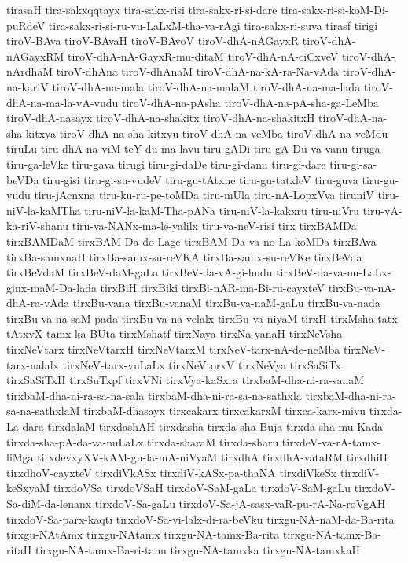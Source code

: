 {tirasaH
tira-sakxqqtayx
tira-sakx-risi
tira-sakx-ri-si-dare
tira-sakx-ri-si-koM-Di-puRdeV
tira-sakx-ri-si-ru-vu-LaLxM-tha-va-rAgi
tira-sakx-ri-suva
tirasf
tirigi
tiroV-BAva
tiroV-BAvaH
tiroV-BAvoV
tiroV-dhA-nAGayxR
tiroV-dhA-nAGayxRM
tiroV-dhA-nA-GayxR-mu-ditaM
tiroV-dhA-nA-ciCxveV
tiroV-dhA-nArdhaM
tiroV-dhAna
tiroV-dhAnaM
tiroV-dhA-na-kA-ra-Na-vAda
tiroV-dhA-na-kariV
tiroV-dhA-na-mala
tiroV-dhA-na-malaM
tiroV-dhA-na-ma-lada
tiroV-dhA-na-ma-la-vA-vudu
tiroV-dhA-na-pAsha
tiroV-dhA-na-pA-sha-ga-LeMba
tiroV-dhA-nasayx
tiroV-dhA-na-shakitx
tiroV-dhA-na-shakitxH
tiroV-dhA-na-sha-kitxya
tiroV-dhA-na-sha-kitxyu
tiroV-dhA-na-veMba
tiroV-dhA-na-veMdu
tiruLu
tiru-dhA-na-viM-teY-du-ma-lavu
tiru-gADi
tiru-gA-Du-va-vanu
tiruga
tiru-ga-leVke
tiru-gava
tirugi
tiru-gi-daDe
tiru-gi-danu
tiru-gi-dare
tiru-gi-sa-beVDa
tiru-gisi
tiru-gi-su-vudeV
tiru-gu-tAtxne
tiru-gu-tatxleV
tiru-guva
tiru-gu-vudu
tiru-jAcnxna
tiru-ku-ru-pe-toMDa
tiru-mUla
tiru-nA-LopxVva
tiruniV
tiru-niV-la-kaMTha
tiru-niV-la-kaM-Tha-pANa
tiru-niV-la-kakxru
tiru-niVru
tiru-vA-ka-riV-shanu
tiru-va-NANx-ma-le-yalilx
tiru-va-neV-risi
tirx
tirxBAMDa
tirxBAMDaM
tirxBAM-Da-do-Lage
tirxBAM-Da-va-no-La-koMDa
tirxBAva
tirxBa-samxnaH
tirxBa-samx-su-reVKA
tirxBa-samx-su-reVKe
tirxBeVda
tirxBeVdaM
tirxBeV-daM-gaLa
tirxBeV-da-vA-gi-hudu
tirxBeV-da-va-nu-LaLx-ginx-maM-Da-lada
tirxBiH
tirxBiki
tirxBi-nAR-ma-Bi-ru-cayxteV
tirxBu-va-nA-dhA-ra-vAda
tirxBu-vana
tirxBu-vanaM
tirxBu-va-naM-gaLu
tirxBu-va-nada
tirxBu-va-na-saM-pada
tirxBu-va-na-velalx
tirxBu-va-niyaM
tirxH
tirxMsha-tatx-tAtxvX-tamx-ka-BUta
tirxMshatf
tirxNaya
tirxNa-yanaH
tirxNeVsha
tirxNeVtarx
tirxNeVtarxH
tirxNeVtarxM
tirxNeV-tarx-nA-de-neMba
tirxNeV-tarx-nalalx
tirxNeV-tarx-vuLaLx
tirxNeVtorxV
tirxNeVya
tirxSaSiTx
tirxSaSiTxH
tirxSuTxpf
tirxVNi
tirxVya-kaSxra
tirxbaM-dha-ni-ra-sanaM
tirxbaM-dha-ni-ra-sa-na-sala
tirxbaM-dha-ni-ra-sa-na-sathxla
tirxbaM-dha-ni-ra-sa-na-sathxlaM
tirxbaM-dhasayx
tirxcakarx
tirxcakarxM
tirxca-karx-mivu
tirxda-La-dara
tirxdalaM
tirxdashAH
tirxdasha
tirxda-sha-Buja
tirxda-sha-mu-Kada
tirxda-sha-pA-da-va-nuLaLx
tirxda-sharaM
tirxda-sharu
tirxdeV-va-rA-tamx-liMga
tirxdevxyXV-kAM-gu-la-mA-niVyaM
tirxdhA
tirxdhA-vataRM
tirxdhiH
tirxdhoV-cayxteV
tirxdiVkASx
tirxdiV-kASx-pa-thaNA
tirxdiVkeSx
tirxdiV-keSxyaM
tirxdoVSa
tirxdoVSaH
tirxdoV-SaM-gaLa
tirxdoV-SaM-gaLu
tirxdoV-Sa-diM-da-lenanx
tirxdoV-Sa-gaLu
tirxdoV-Sa-jA-sasx-vaR-pu-rA-Na-roVgAH
tirxdoV-Sa-parx-kaqti
tirxdoV-Sa-vi-lalx-di-ra-beVku
tirxgu-NA-naM-da-Ba-rita
tirxgu-NAtAmx
tirxgu-NAtamx
tirxgu-NA-tamx-Ba-rita
tirxgu-NA-tamx-Ba-ritaH
tirxgu-NA-tamx-Ba-ri-tanu
tirxgu-NA-tamxka
tirxgu-NA-tamxkaH
}
